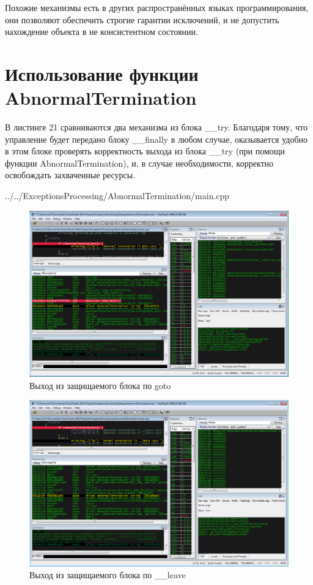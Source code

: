\documentclass[a4paper, 12pt]{report}		%
\begin{document}
Похожие механизмы есть в других распространённых языках программирования, они позволяют обеспечить строгие гарантии исключений, и не допустить нахождение объекта в не консистентном состоянии.
\newpage

\chapter*{Использование функции AbnormalTermination}

В листинге 21 сравниваются два механизма из блока \_\_try. Благодаря тому, что управление будет передано блоку \_\_finally в любом случае, оказывается удобно в этом блоке проверять корректность выхода из блока \_\_try (при помощи функции AbnormalTermination), и, в случае необходимости, корректно освобождать захваченные ресурсы.


{../../ExceptionsProcessing/AbnormalTermination/main.cpp}

\begin{figure}[h!]
\centering
\includegraphics[scale=0.50]{res/014}
\caption{Выход из защищаемого блока по goto}
\end{figure}

\begin{figure}[h!]
\centering
\includegraphics[scale=0.50]{res/015}
\caption{Выход из защищаемого блока по \_\_leave}
\end{figure}
\end{document}
